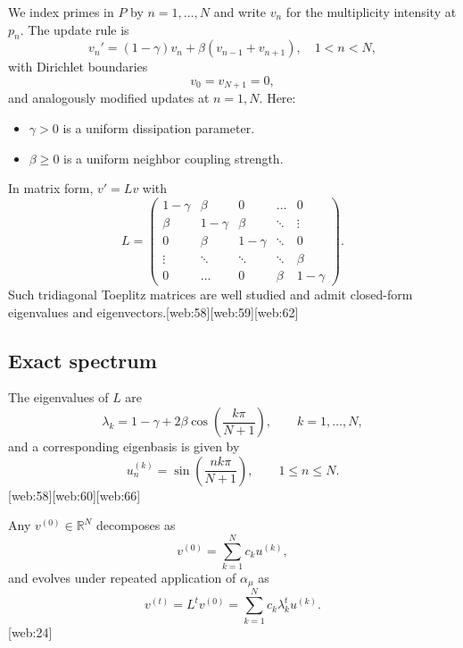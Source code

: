 \documentclass[11pt]{article}
\begin{document}
We index primes in $P$ by $n=1,\dots,N$ and write $v_n$ for the multiplicity intensity at $p_n$.
The update rule is
\begin{equation}\label{eq:update}
    v_n' = (1 - \gamma) v_n + \beta (v_{n-1} + v_{n+1}), \quad 1<n<N,
\end{equation}
with Dirichlet boundaries
\begin{equation}
    v_0 = v_{N+1} = 0,
\end{equation}
and analogously modified updates at $n = 1,N$.
Here:
\begin{itemize}
    \item $\gamma > 0$ is a uniform dissipation parameter.
    \item $\beta \ge 0$ is a uniform neighbor coupling strength.
\end{itemize}

In matrix form, $v' = Lv$ with
\begin{equation}
    L =
    \begin{pmatrix}
        1-\gamma & \beta      & 0        & \dots  & 0 \\
        \beta      & 1-\gamma & \beta    & \ddots & \vdots \\
        0          & \beta      & 1-\gamma & \ddots & 0 \\
        \vdots     & \ddots   & \ddots   & \ddots & \beta \\
        0          & \dots    & 0        & \beta  & 1-\gamma
    \end{pmatrix}.
\end{equation}
Such tridiagonal Toeplitz matrices are well studied and admit closed-form eigenvalues and eigenvectors.[web:58][web:59][web:62]

\subsection{Exact spectrum}

The eigenvalues of $L$ are
\begin{equation}
    \lambda_k = 1 - \gamma + 2\beta \cos\left(\frac{k\pi}{N+1}\right),
    \qquad k = 1,\dots,N,
\end{equation}
and a corresponding eigenbasis is given by
\begin{equation}
    u_n^{(k)} = \sin\left(\frac{nk\pi}{N+1}\right), \qquad 1 \le n \le N.
\end{equation}[web:58][web:60][web:66]

Any $v^{(0)} \in \mathbb{R}^N$ decomposes as
\begin{equation}
    v^{(0)} = \sum_{k=1}^N c_k u^{(k)},
\end{equation}
and evolves under repeated application of $\alpha_\mu$ as
\begin{equation}
    v^{(t)} = L^t v^{(0)} = \sum_{k=1}^N c_k \lambda_k^t u^{(k)}.
\end{equation}[web:24]
\end{document}
